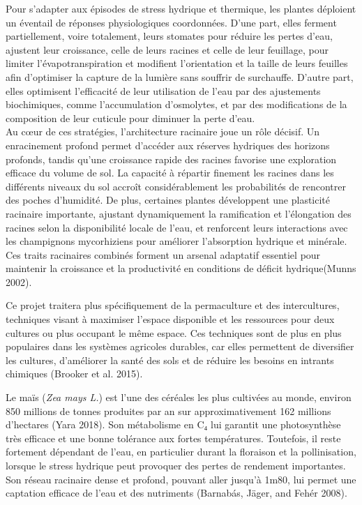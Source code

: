\documentclass[
]{article}
\begin{document}
Pour s'adapter aux épisodes de stress hydrique et thermique, les plantes
déploient un éventail de réponses physiologiques coordonnées. D'une
part, elles ferment partiellement, voire totalement, leurs stomates pour
réduire les pertes d'eau, ajustent leur croissance, celle de leurs
racines et celle de leur feuillage, pour limiter l'évapotranspiration et
modifient l'orientation et la taille de leurs feuilles afin d'optimiser
la capture de la lumière sans souffrir de surchauffe. D'autre part,
elles optimisent l'efficacité de leur utilisation de l'eau par des
ajustements biochimiques, comme l'accumulation d'osmolytes, et par des
modifications de la composition de leur cuticule pour diminuer la perte
d'eau.\\
Au cœur de ces stratégies, l'architecture racinaire joue un rôle
décisif. Un enracinement profond permet d'accéder aux réserves hydriques
des horizons profonds, tandis qu'une croissance rapide des racines
favorise une exploration efficace du volume de sol. La capacité à
répartir finement les racines dans les différents niveaux du sol accroît
considérablement les probabilités de rencontrer des poches d'humidité.
De plus, certaines plantes développent une plasticité racinaire
importante, ajustant dynamiquement la ramification et l'élongation des
racines selon la disponibilité locale de l'eau, et renforcent leurs
interactions avec les champignons mycorhiziens pour améliorer
l'absorption hydrique et minérale. Ces traits racinaires combinés
forment un arsenal adaptatif essentiel pour maintenir la croissance et
la productivité en conditions de déficit hydrique(Munns 2002).

\hfill\break
Ce projet traitera plus spécifiquement de la permaculture et des
intercultures, techniques visant à maximiser l'espace disponible et les
ressources pour deux cultures ou plus occupant le même espace. Ces
techniques sont de plus en plus populaires dans les systèmes agricoles
durables, car elles permettent de diversifier les cultures, d'améliorer
la santé des sols et de réduire les besoins en intrants chimiques
(Brooker et al. 2015).

Le maïs (\emph{Zea mays L.}) est l'une des céréales les plus cultivées
au monde, environ 850 millions de tonnes produites par an sur
approximativement 162 millions d'hectares (Yara 2018). Son métabolisme
en C₄ lui garantit une photosynthèse très efficace et une bonne
tolérance aux fortes températures. Toutefois, il reste fortement
dépendant de l'eau, en particulier durant la floraison et la
pollinisation, lorsque le stress hydrique peut provoquer des pertes de
rendement importantes. Son réseau racinaire dense et profond, pouvant
aller jusqu'à 1m80, lui permet une captation efficace de l'eau et des
nutriments (Barnabás, Jäger, and Fehér 2008).
\end{document}
